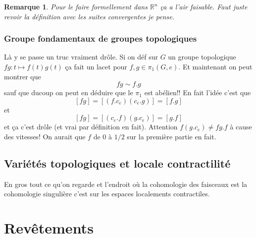 \documentclass[a4paper,12pt]{book}
\newcommand{\R}{\mathbb{R}}
\theoremstyle{plain}
\newtheorem{rem}{Remarque}
\theoremstyle{definition}
\theoremstyle{remark}
\begin{document}
\begin{rem}
  Pour le faire formellement dans $\R^n$ ça a l'air faisable. Faut
  juste revoir la définition avec les suites convergentes je pense.
\end{rem}

\subsection{Groupe fondamentaux de groupes topologiques}
Là y se passe un truc vraiment drôle. Si on déf sur $G$ un
groupe topologique $fg\colon t\mapsto f(t)g(t)$ ça fait
un lacet pour $f,g\in \pi_1(G,e)$. Et maintenant on peut montrer
que 
\[fg\sim f.g\]
sauf que ducoup on peut en déduire que le $\pi_1$ est abélien!!
En fait l'idée c'est que
\[[fg]=[(f.c_e)(c_e.g)]=[f.g]\]
et
\[[fg]=[(c_e.f)(g.c_e)]=[g.f]\]
et ça c'est drôle (et vrai par définition en fait). Attention
$f(g.c_e)\ne fg.f$ à cause des
vitesses! On aurait que $f$ de $0$ à $1/2$ sur la première partie
en fait.

\section{Variétés topologiques et locale contractilité}
En gros tout ce qu'on regarde et l'endroit où la cohomologie
des faisceaux est la cohomologie singulière c'est sur les
espaces localements contractiles.

\chapter{Revêtements}

\end{document}
